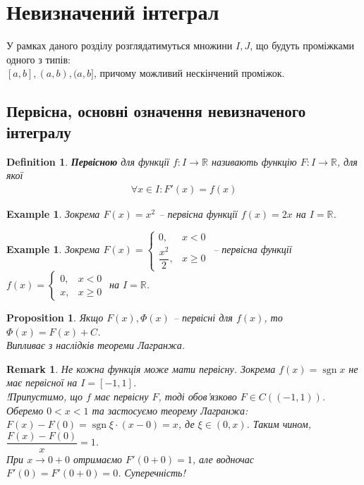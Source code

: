 \documentclass[a4paper, 10pt]{article}
\DeclareMathOperator\sign{sgn}
\theoremstyle{theoremdd}
\theoremstyle{theoremdd}
\theoremstyle{theoremdd}
\newtheorem{definition}[theorem]{Definition}
\theoremstyle{theoremdd}
\theoremstyle{theoremdd}
\newtheorem{example}[theorem]{Example}
\theoremstyle{theoremdd}
\newtheorem{proposition}[theorem]{Proposition}
\theoremstyle{theoremdd}
\newtheorem{remark}[theorem]{Remark}
\theoremstyle{theoremdd}
\theoremstyle{theoremdd}
\begin{document}

\tableofcontents
\newpage
\iffalse
\section{Невизначений інтеграл}
У рамках даного розділу розглядатимуться множини $I,J$, що будуть проміжками одного з типів:\\
$[a,b], (a,b), (a,b]$, причому можливий нескінчений проміжок.
\subsection{Первісна, основні означення невизначеного інтегралу}

\begin{definition}
\textbf{Первісною} для функції $f \colon I \to \mathbb{R}$ називають функцію $F \colon I \to \mathbb{R}$, для якої
\begin{align*}
\forall x \in I: F'(x) = f(x)
\end{align*}
\end{definition}

\begin{example}
Зокрема $F(x) = x^2$ -- первісна функції $f(x) = 2x$ на $I = \mathbb{R}$.
\end{example}

\begin{example}
Зокрема $F(x) = \begin{cases} 0, & x < 0 \\ \dfrac{x^2}{2}, & x \geq 0\end{cases}$ -- первісна функції $f(x) = \begin{cases} 0, & x < 0 \\ x, & x \geq 0 \end{cases}$ на $I = \mathbb{R}$.
\end{example}

\begin{proposition}
Якщо $F(x), \Phi(x)$ -- первісні для $f(x)$, то $\Phi(x) = F(x) + C$.\\
\textit{Випливає з наслідків теореми Лагранжа.}
\end{proposition}

\begin{remark}
Не кожна функція може мати первісну. Зокрема $f(x) = \sign x$ не має первісної на $I = [-1,1]$.\\
!Припустимо, що $f$ має первісну $F$, тоді обов'язково $F \in C((-1,1))$. Оберемо $0 < x < 1$ та застосуємо теорему Лагранжа:\\
$F(x) - F(0) = \sign \xi \cdot (x - 0) = x$, де $\xi \in (0,x)$. Таким чином, $\dfrac{F(x)-F(0)}{x} = 1$.\\
При $x \to 0+0$ отримаємо $F'(0+0) = 1$, але водночас $F'(0) = F'(0+0) = 0$. Суперечність!
\end{remark}
\end{document}
